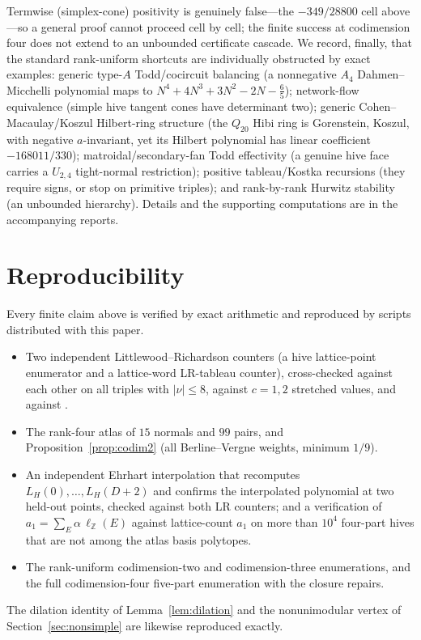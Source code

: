 \documentclass[11pt]{amsart}
\theoremstyle{definition}
\newcommand{\Z}{\mathbb{Z}}
\begin{document}
Termwise (simplex-cone) positivity is genuinely false---the $-349/28800$ cell
above---so a general proof cannot proceed cell by cell; the finite success at
codimension four does not extend to an unbounded certificate cascade. We record,
finally, that the standard rank-uniform shortcuts are individually obstructed by
exact examples: generic type-$A$ Todd/cocircuit balancing (a nonnegative
$A_4$ Dahmen--Micchelli polynomial maps to $N^4+4N^3+3N^2-2N-\tfrac65$);
network-flow equivalence (simple hive tangent cones have determinant two);
generic Cohen--Macaulay/Koszul Hilbert-ring structure (the $Q_{20}$ Hibi ring is
Gorenstein, Koszul, with negative $a$-invariant, yet its Hilbert polynomial has
linear coefficient $-168011/330$); matroidal/secondary-fan Todd effectivity
(a genuine hive face carries a $U_{2,4}$ tight-normal restriction); positive
tableau/Kostka recursions (they require signs, or stop on primitive triples);
and rank-by-rank Hurwitz stability (an unbounded hierarchy). Details and the
supporting computations are in the accompanying reports.

\section{Reproducibility}\label{sec:repro}

Every finite claim above is verified by exact arithmetic and reproduced by
scripts distributed with this paper.
\begin{itemize}
\item Two independent Littlewood--Richardson counters (a hive lattice-point
enumerator and a lattice-word LR-tableau counter), cross-checked against each
other on all triples with $|\nu|\le 8$, against $c=1,2$ stretched values, and
against \cite{lrcalc}.
\item The rank-four atlas of $15$ normals and $99$ pairs, and
Proposition~\ref{prop:codim2} (all Berline--Vergne weights, minimum $1/9$).
\item An independent Ehrhart interpolation that recomputes $L_H(0),\dots,L_H(D+2)$
and confirms the interpolated polynomial at two held-out points, checked against
both LR counters; and a verification of $a_1=\sum_E\alpha\,\ell_{\Z}(E)$ against
lattice-count $a_1$ on more than $10^4$ four-part hives that are not among the
atlas basis polytopes.
\item The rank-uniform codimension-two and codimension-three enumerations, and
the full codimension-four five-part enumeration with the closure repairs.
\end{itemize}
The dilation identity of Lemma~\ref{lem:dilation} and the nonunimodular vertex of
Section~\ref{sec:nonsimple} are likewise reproduced exactly.
\end{document}
